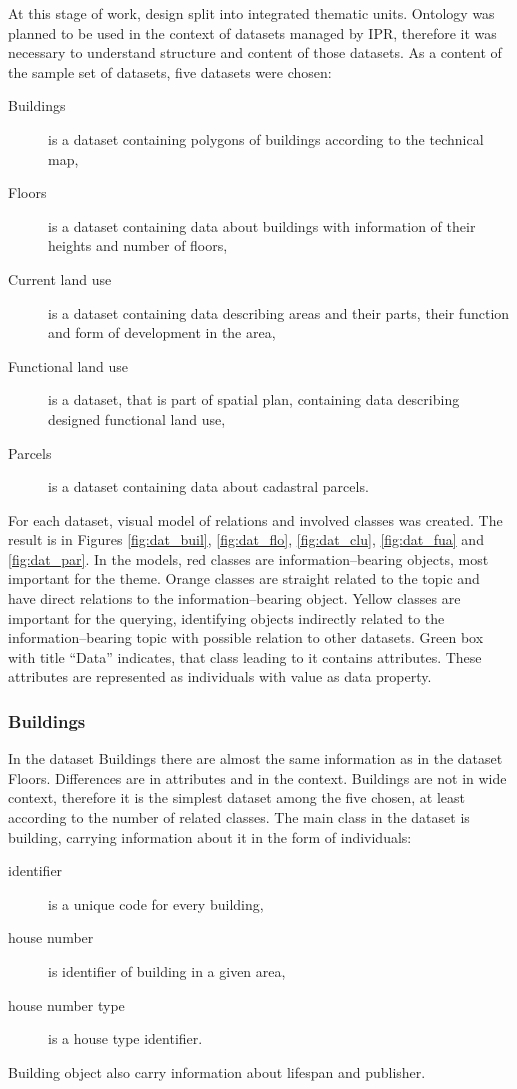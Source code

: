 \documentclass{lncs-template/llncs}
\begin{document}
At this stage of work, design split into integrated thematic units. Ontology was planned to be used in the context of datasets managed by IPR, therefore it was necessary to understand structure and content of those datasets. As a content of the sample set of datasets, five datasets were chosen:
\begin{description}
 \item[Buildings] is a dataset containing polygons of buildings according to the technical map,
 \item[Floors] is a dataset containing data about buildings with information of their heights and number of floors,
 \item[Current land use] is a dataset containing data describing areas and their parts, their function and form of development in the area,
 \item[Functional land use] is a dataset, that is part of spatial plan, containing data describing designed functional land use,
 \item[Parcels] is a dataset containing data about cadastral parcels.
\end{description}
For each dataset, visual model of relations and involved classes was created. The result is in Figures \ref{fig:dat_buil}, \ref{fig:dat_flo}, \ref{fig:dat_clu}, \ref{fig:dat_fua} and \ref{fig:dat_par}. In the models, red classes are information--bearing objects, most important for the theme. Orange classes are straight related to the topic and have direct relations to the information--bearing object. Yellow classes are important for the querying, identifying objects indirectly related to the information--bearing topic with possible relation to other datasets. Green box with title ``Data'' indicates, that class leading to it contains attributes. These attributes are represented as individuals with value as data property.

\subsubsection{Buildings}

In the dataset Buildings there are almost the same information as in the dataset Floors. Differences are in attributes and in the context. Buildings are not in wide context, therefore it is the simplest dataset among the five chosen, at least according to the number of related classes. The main class in the dataset is building, carrying information about it in the form of individuals:
\begin{description}
\item[identifier] is a unique code for every building, 
\item[house number] is identifier of building in a given area,
\item[house number type] is a house type identifier.
\end{description}
Building object also carry information about lifespan and publisher.
\end{document}
